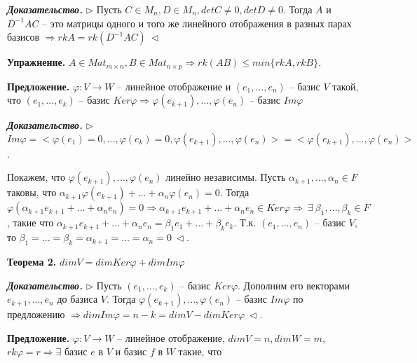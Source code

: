 \vspace{\baselineskip}
\textbf{\textit{Доказательство.}} $\rhd$ Пусть $C \in M_n, D \in M_n, detC \neq 0, detD \neq 0$. Тогда $A$ и $D^{-1} A C$ -- это матрицы одного и того же линейного отображения в разных парах базисов $\Rightarrow rkA = rk (D^{-1} A C) \ \lhd$

\vspace{\baselineskip}
\textbf{Упражнение.} $A \in Mat_{m \times n}, B \in Mat_{n \times p} \Rightarrow rk(AB) \leq min\{rk A, rkB\}$.

\vspace{\baselineskip}
\textbf{Предложение.} $\varphi: V \rightarrow W$ -- линейное отображение и $(e_1, \dots, e_n)$ -- базис $V$ такой, что $(e_1, \dots, e_k)$ -- базис $Ker \varphi \Rightarrow \varphi(e_{k+1}), \dots, \varphi(e_n)$ -- базис $Im \varphi$

\vspace{\baselineskip}
\textbf{\textit{Доказательство.}} $\rhd$ $Im \varphi = <\varphi(e_1) = 0, \dots, \varphi(e_k) = 0, \varphi(e_{k+1}), \dots, \varphi(e_n)> = <\varphi(e_{k+1}), \dots, \varphi(e_n)>$.

Покажем, что $\varphi(e_{k+1}), \dots, \varphi(e_n)$ линейно независимы. Пусть $\alpha_{k+1}, \dots, \alpha_n \in F$ таковы, что $\alpha_{k+1} \varphi(e_{k+1}) + \dots + \alpha_n \varphi(e_n) = 0$. Тогда $\varphi(\alpha_{k+1} e_{k+1} + \dots + \alpha_n e_n) = 0 \Rightarrow \alpha_{k+1} e_{k+1} + \dots + \alpha_n e_n \in Ker \varphi \Rightarrow \ \exists \ \beta_1, \dots, \beta_k \in F$, такие что $\alpha_{k+1} e_{k+1} + \dots + \alpha_n e_n = \beta_1 e_1 + \dots + \beta_k e_k$. Т.к. $(e_1, \dots, e_n)$ -- базис $V$, то $\beta_1 = \dots = \beta_k = \alpha_{k+1} = \dots = \alpha_n = 0 \ \lhd$.

\vspace{\baselineskip}
\textbf{Теорема 2.} $dimV = dim Ker \varphi + dim Im \varphi$

\vspace{\baselineskip}
\textbf{\textit{Доказательство.}} $\rhd$ Пусть $(e_1, \dots, e_k)$ -- базис $Ker \varphi$. Дополним его векторами $e_{k+1}, \dots, e_n$ до базиса $V$. Тогда $\varphi(e_{k+1}), \dots, \varphi(e_n)$ -- базис $Im \varphi$ по предложению $\Rightarrow dim Im \varphi = n - k = dim V - dim Ker \varphi \ \lhd$.

\vspace{\baselineskip}
\textbf{Предложение.} $\varphi: V \rightarrow W$ -- линейное отображение, $dim V = n, dim W = m$, $rk \varphi = r \Rightarrow \exists$ базис $e$ в $V$ и базис $f$ в $W$ такие, что 

